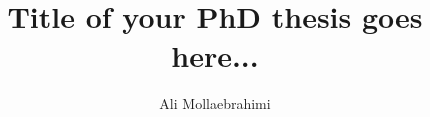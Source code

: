 \documentclass[10pt,a4paper]{report}
\title{Title of your PhD thesis goes here...}
\author{Ali Mollaebrahimi}
\begin{document}
 

\begin{titlepage}
 
\end{titlepage}


\renewcommand{\contentsname}{Inhoudsopgave} 
\tableofcontents

\renewcommand{\figurename}{Figuur} 


\clearpage 
{}
\renewcommand\bibname{Bibliografie}


\end{document}
